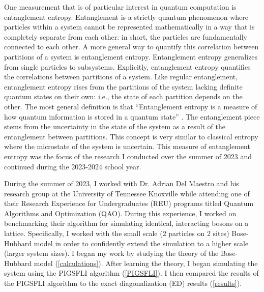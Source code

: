 One measurement that is of particular interest in quantum computation is entanglement entropy. Entanglement is a strictly quantum phenomenon where particles within a system cannot be represented mathematically in a way that is completely separate from each other: in short, the particles are fundamentally connected to each other. A more general way to quantify this correlation between partitions of a system is entanglement entropy. Entanglement entropy generalizes from single particles to subsystems. Explicitly, entanglement entropy quantifies the correlations between partitions of a system. Like regular entanglement, entanglement entropy rises from the partitions of the system lacking definite quantum states on their own: i.e., the state of each partition depends on the other. The most general definition is that ``Entanglement entropy is a measure of how quantum information is stored in a quantum state'' \cite{hartman_lectures_2015}. The entanglement piece stems from the uncertainty in the state of the system as a result of the entanglement between partitions. This concept is very similar to classical entropy where the microstate of the system is uncertain. This measure of entanglement entropy was the focus of the research I conducted over the summer of 2023 and continued during the 2023-2024 school year.

During the summer of 2023, I worked with Dr. Adrian Del Maestro and his research group at the University of Tennessee Knoxville while attending one of their Research Experience for Undergraduates (REU) programs titled Quantum Algorithms and Optimization (QAO). During this experience, I worked on benchmarking their algorithm for simulating identical, interacting bosons on a lattice. Specifically, I worked with the small scale (2 particles on 2 sites) Bose-Hubbard model in order to confidently extend the simulation to a higher scale (larger system sizes). I began my work by studying the theory of the Bose-Hubbard model (\cref*{calculations}). After learning the theory, I began simulating the system using the PIGSFLI algorithm (\cref*{PIGSFLI}). I then compared the results of the PIGSFLI algorithm to the exact diagonalization (ED) results (\cref*{results}). 